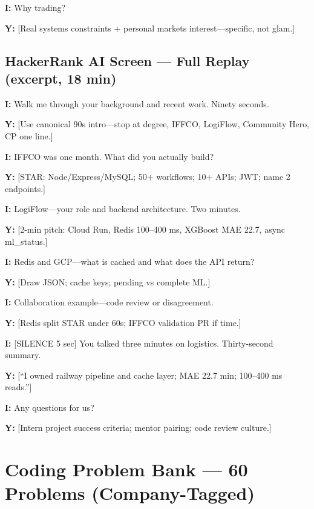 \documentclass[9pt,a4paper]{article}
\begin{document}
\textbf{I:} Why trading?

\textbf{Y:} [Real systems constraints + personal markets interest---specific, not glam.]

\newpage
\subsection{HackerRank AI Screen --- Full Replay (excerpt, 18 min)}

\textbf{I:} Walk me through your background and recent work. Ninety seconds.

\textbf{Y:} [Use canonical 90s intro---stop at degree, IFFCO, LogiFlow, Community Hero, CP one line.]

\textbf{I:} IFFCO was one month. What did you actually build?

\textbf{Y:} [STAR: Node/Express/MySQL; 50+ workflows; 10+ APIs; JWT; name 2 endpoints.]

\textbf{I:} LogiFlow---your role and backend architecture. Two minutes.

\textbf{Y:} [2-min pitch: Cloud Run, Redis 100--400 ms, XGBoost MAE 22.7, async ml\_status.]

\textbf{I:} Redis and GCP---what is cached and what does the API return?

\textbf{Y:} [Draw JSON; cache keys; pending vs complete ML.]

\textbf{I:} Collaboration example---code review or disagreement.

\textbf{Y:} [Redis split STAR under 60s; IFFCO validation PR if time.]

\textbf{I:} [SILENCE 5 sec] You talked three minutes on logistics. Thirty-second summary.

\textbf{Y:} [``I owned railway pipeline and cache layer; MAE 22.7 min; 100--400 ms reads.'']

\textbf{I:} Any questions for us?

\textbf{Y:} [Intern project success criteria; mentor pairing; code review culture.]

\newpage
\section{Coding Problem Bank --- 60 Problems (Company-Tagged)}
\end{document}
